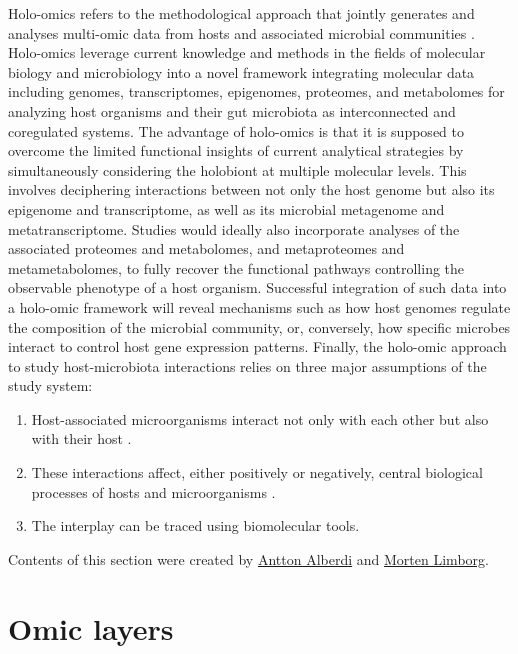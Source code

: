 \documentclass[
]{book}
\providecommand{\tightlist}{%
  \setlength{\itemsep}{0pt}\setlength{\parskip}{0pt}}
\begin{document}
Holo-omics refers to the methodological approach that jointly generates and analyses multi-omic data from hosts and associated microbial communities \citep{Nyholm2020-ua}. Holo-omics leverage current knowledge and methods in the fields of molecular biology and microbiology into a novel framework integrating molecular data including genomes, transcriptomes, epigenomes, proteomes, and metabolomes for analyzing host organisms and their gut microbiota as interconnected and coregulated systems. The advantage of holo-omics is that it is supposed to overcome the limited functional insights of current analytical strategies by simultaneously considering the holobiont at multiple molecular levels. This involves deciphering interactions between not only the host genome but also its epigenome and transcriptome, as well as its microbial metagenome and metatranscriptome. Studies would ideally also incorporate analyses of the associated proteomes and metabolomes, and metaproteomes and metametabolomes, to fully recover the functional pathways controlling the observable phenotype of a host organism. Successful integration of such data into a holo-omic framework will reveal mechanisms such as how host genomes regulate the composition of the microbial community, or, conversely, how specific microbes interact to control host gene expression patterns. Finally, the holo-omic approach to study host-microbiota interactions relies on three major assumptions of the study system:

\begin{enumerate}
\def\labelenumi{\arabic{enumi}.}
\tightlist
\item
  Host-associated microorganisms interact not only with each other but also with their host \citep{Fischer2017-wa}.
\item
  These interactions affect, either positively or negatively, central biological processes of hosts and microorganisms \citep{Wu2012-jt}.
\item
  The interplay can be traced using biomolecular tools.
\end{enumerate}

Contents of this section were created by \protect\hyperlink{antton-alberdi}{Antton Alberdi} and \protect\hyperlink{morten-limborg}{Morten Limborg}.

\hypertarget{omic-layers}{%
\section{Omic layers}\label{omic-layers}}
\end{document}
